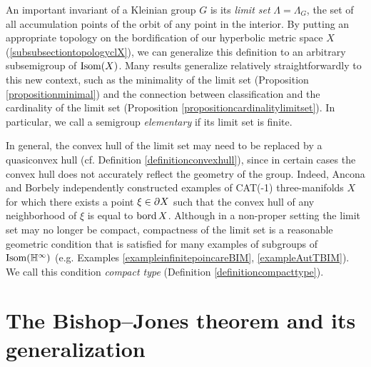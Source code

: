 An important invariant of a Kleinian group $G$ is its \emph{limit set} $\Lambda = \Lambda_G$, the set of all accumulation points of the orbit of any point in the interior. By putting an appropriate topology on the bordification of our hyperbolic metric space $X$ (\6\ref{subsubsectiontopologyclX}), we can generalize this definition to an arbitrary subsemigroup of $\operatorname{Isom}(X)$. Many results generalize relatively straightforwardly to this new context, such as the minimality of the limit set (Proposition \ref{propositionminimal}) and the connection between classification and the cardinality of the limit set (Proposition \ref{propositioncardinalitylimitset}). In particular, we call a semigroup \emph{elementary} if its limit set is finite.

In general, the convex hull of the limit set may need to be replaced by a quasiconvex hull (cf. Definition \ref{definitionconvexhull}), since in certain cases the convex hull does not accurately reflect the geometry of the group. Indeed, Ancona \cite[Corollary C]{Ancona} and Borbely \cite[Theorem 1]{Borbely} independently constructed examples of CAT(-1) three-manifolds $X$ for which there exists a point $\xi\in\partial X$ such that the convex hull of any neighborhood of $\xi$ is equal to $\operatorname{bord} X$. Although in a non-proper setting the limit set may no longer be compact, compactness of the limit set is a reasonable geometric condition that is satisfied for many examples of subgroups of $\Isom(\H^\infty)$ (e.g. Examples \ref{exampleinfinitepoincareBIM}, \ref{exampleAutTBIM}). We call this condition \emph{compact type} (Definition \ref{definitioncompacttype}).


\bigskip
\section{The Bishop--Jones theorem and its generalization}




